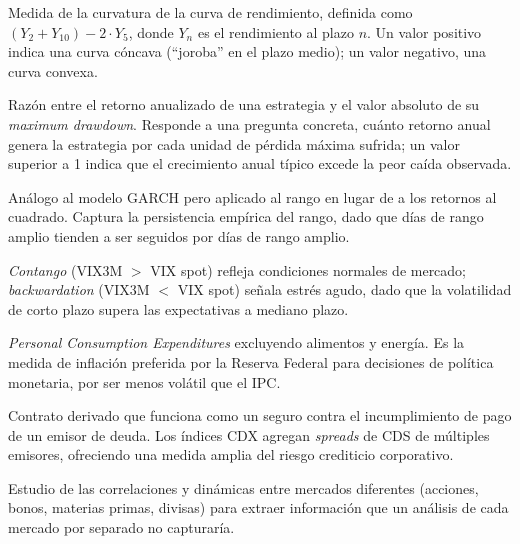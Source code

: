 \begin{description}[style=nextline, leftmargin=1.5cm]
\item[\hypertarget{glos:butterfly}{\textit{Butterfly spread}}]
Medida de la curvatura de la curva de rendimiento, definida como $(Y_{2} + Y_{10}) - 2 \cdot Y_{5}$, donde $Y_n$ es el rendimiento al plazo $n$. Un valor positivo indica una curva c\'oncava (``joroba'' en el plazo medio); un valor negativo, una curva convexa.

\item[\hypertarget{glos:calmar_ratio}{\textit{Calmar Ratio}}]
Raz\'on entre el retorno anualizado de una estrategia y el valor absoluto de su \textit{maximum drawdown}. Responde a una pregunta concreta, cu\'anto retorno anual genera la estrategia por cada unidad de p\'erdida m\'axima sufrida; un valor superior a 1 indica que el crecimiento anual t\'ipico excede la peor ca\'ida observada.

\item[\hypertarget{glos:carr}{CARR (\textit{Conditional Autoregressive Range})}]
An\'alogo al modelo GARCH pero aplicado al rango en lugar de a los retornos al cuadrado. Captura la persistencia emp\'irica del rango, dado que d\'ias de rango amplio tienden a ser seguidos por d\'ias de rango amplio.

\item[\hypertarget{glos:contango}{\textit{Contango} / \textit{Backwardation}}]
\textit{Contango} (VIX3M $>$ VIX spot) refleja condiciones normales de mercado; \textit{backwardation} (VIX3M $<$ VIX spot) se\~nala estr\'es agudo, dado que la volatilidad de corto plazo supera las expectativas a mediano plazo.

\item[\hypertarget{glos:core_pce}{\textit{Core PCE}}]
\textit{Personal Consumption Expenditures} excluyendo alimentos y energ\'ia. Es la medida de inflaci\'on preferida por la Reserva Federal para decisiones de pol\'itica monetaria, por ser menos vol\'atil que el IPC.

\item[\hypertarget{glos:cds}{\textit{Credit Default Swap} (CDS)}]
Contrato derivado que funciona como un seguro contra el incumplimiento de pago de un emisor de deuda. Los \'indices CDX agregan \textit{spreads} de CDS de m\'ultiples emisores, ofreciendo una medida amplia del riesgo crediticio corporativo.

\item[\hypertarget{glos:cross_asset}{An\'alisis \textit{cross-asset}}]
Estudio de las correlaciones y din\'amicas entre mercados diferentes (acciones, bonos, materias primas, divisas) para extraer informaci\'on que un an\'alisis de cada mercado por separado no capturar\'ia.


\end{description}
